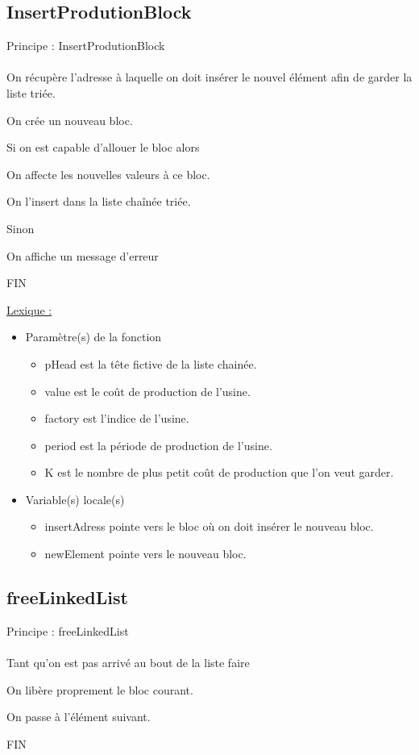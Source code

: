 \documentclass[a4paper]{article}
\newcommand\tab[1][1cm]{\hspace*{#1}}
\begin{document}
\subsection{InsertProdutionBlock}
\begin{algorithm}
Principe : InsertProdutionBlock
\\
\\
\tab On récupère l'adresse à laquelle on doit insérer le nouvel élément afin de garder la liste triée.

\tab On crée un nouveau bloc.

\tab Si on est capable d'allouer le bloc alors

\tab \tab On affecte les nouvelles valeurs à ce bloc.

\tab \tab On l'insert dans la liste chaînée triée.

\tab Sinon 

\tab \tab On affiche un message d'erreur

FIN
\end{algorithm}

\underline{Lexique :}
\begin{itemize}
\item Paramètre(s) de la fonction  
\begin{itemize}
\item pHead est la tête fictive de la liste chainée.
\item value est le coût de production de l'usine.
\item factory est l'indice de l'usine.
\item period est la période de production de l'usine.
\item K est le nombre de plus petit coût de production que l'on veut garder.
\end{itemize}
\item Variable(s) locale(s)
\begin{itemize}
\item insertAdress pointe vers le bloc où on doit insérer le nouveau bloc.
\item newElement pointe vers le nouveau bloc.
\end{itemize}
\end{itemize}

\newpage
\subsection{freeLinkedList}
\begin{algorithm}
Principe : freeLinkedList
\\
\\
\tab Tant qu'on est pas arrivé au bout de la liste faire

\tab \tab On libère proprement le bloc courant.

\tab \tab On passe à l'élément suivant.

FIN
\end{algorithm}
\end{document}
